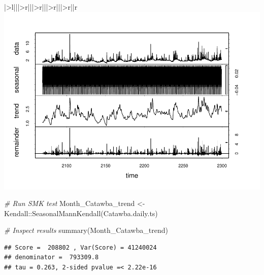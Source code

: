 \documentclass[
  12pt,
]{article}
\newenvironment{Shaded}{\begin{snugshade}}{\end{snugshade}}
\newcommand{\AttributeTok}[1]{\textcolor[rgb]{0.77,0.63,0.00}{#1}}
\newcommand{\CommentTok}[1]{\textcolor[rgb]{0.56,0.35,0.01}{\textit{#1}}}
\newcommand{\DecValTok}[1]{\textcolor[rgb]{0.00,0.00,0.81}{#1}}
\newcommand{\DocumentationTok}[1]{\textcolor[rgb]{0.56,0.35,0.01}{\textbf{\textit{#1}}}}
\newcommand{\FunctionTok}[1]{\textcolor[rgb]{0.00,0.00,0.00}{#1}}
\newcommand{\NormalTok}[1]{#1}
\newcommand{\OtherTok}[1]{\textcolor[rgb]{0.56,0.35,0.01}{#1}}
\newcommand{\SpecialCharTok}[1]{\textcolor[rgb]{0.00,0.00,0.00}{#1}}
\begin{document}
\begin{table}
\begin{tabular}[t]{|>{}l|||>{}r|||>{}r|||>{}r|||>{}r||r}
\includegraphics{Project_Template_files/figure-latex/TimeSeries-1.pdf}

\begin{Shaded}
\begin{Highlighting}[]
\CommentTok{\# Run SMK test}
\NormalTok{Month\_Catawba\_trend }\OtherTok{\textless{}{-}}\NormalTok{ Kendall}\SpecialCharTok{::}\FunctionTok{SeasonalMannKendall}\NormalTok{(Catawba.daily.ts)}

\CommentTok{\# Inspect results}
\FunctionTok{summary}\NormalTok{(Month\_Catawba\_trend)}
\end{Highlighting}
\end{Shaded}

\begin{verbatim}
## Score =  208802 , Var(Score) = 41240024
## denominator =  793309.8
## tau = 0.263, 2-sided pvalue =< 2.22e-16
\end{verbatim}

\begin{Shaded}
\end{Shaded}
\end{tabular}
\end{table}
\end{document}
